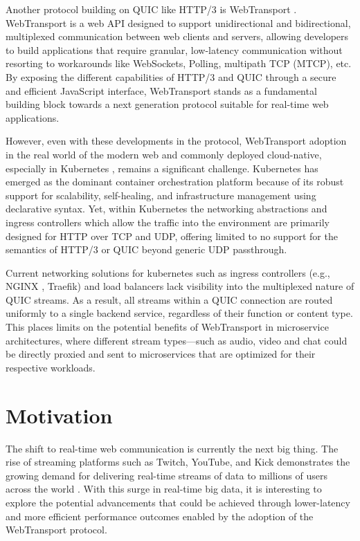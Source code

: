 Another protocol building on QUIC like HTTP/3 is WebTransport \cite{webtransport-draft}. WebTransport is a web API designed to support unidirectional and bidirectional, multiplexed communication between web clients and servers, allowing developers to build applications that require granular, low-latency communication without resorting to workarounds like WebSockets, Polling, multipath TCP (MTCP), etc. By exposing the different capabilities of HTTP/3 and QUIC through a secure and efficient JavaScript interface, WebTransport stands as a fundamental building block towards a next generation protocol suitable for real-time web applications.

However, even with these developments in the protocol, WebTransport adoption in the real world of the modern web and commonly deployed cloud-native, especially in Kubernetes \cite{kubernetes-docs}, remains a significant challenge. Kubernetes has emerged as the dominant container orchestration platform because of its robust support for scalability, self-healing, and infrastructure management using declarative syntax. Yet, within Kubernetes the networking abstractions and ingress controllers which allow the traffic into the environment are primarily designed for HTTP over TCP and UDP, offering limited to no support for the semantics of HTTP/3 or QUIC beyond generic UDP passthrough.

Current networking solutions for kubernetes such as ingress controllers (e.g., NGINX \cite{nginx-ingress-docs}, Traefik) and load balancers lack visibility into the multiplexed nature of QUIC streams. As a result, all streams within a QUIC connection are routed uniformly to a single backend service, regardless of their function or content type. This places limits on the potential benefits of WebTransport in microservice architectures, where different stream types—such as audio, video and chat could be directly proxied and sent to microservices that are optimized for their respective workloads.




\section{Motivation}

The shift to real-time web communication is currently the next big thing. The rise of streaming platforms such as Twitch, YouTube, and Kick demonstrates the growing demand for delivering real-time streams of data to millions of users across the world \cite{kreps2011}. With this surge in real-time big data, it is interesting to explore the potential advancements that could be achieved through lower-latency and more efficient performance outcomes enabled by the adoption of the WebTransport protocol.


